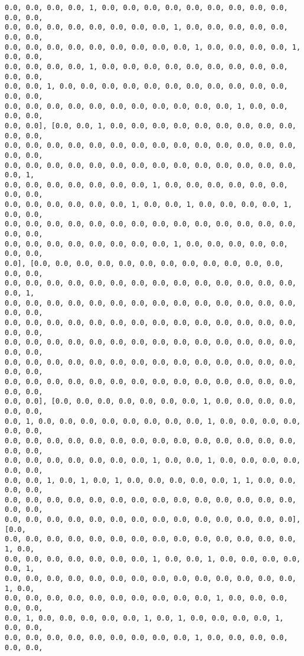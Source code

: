 \documentclass[11pt]{article}
\begin{document}
\begin{Verbatim}[commandchars=\\\{\}]
0.0, 0.0, 0.0, 0.0, 1, 0.0, 0.0, 0.0, 0.0, 0.0, 0.0, 0.0, 0.0, 0.0, 0.0, 0.0,
0.0, 0.0, 0.0, 0.0, 0.0, 0.0, 0.0, 0.0, 1, 0.0, 0.0, 0.0, 0.0, 0.0, 0.0, 0.0,
0.0, 0.0, 0.0, 0.0, 0.0, 0.0, 0.0, 0.0, 0.0, 1, 0.0, 0.0, 0.0, 0.0, 1, 0.0, 0.0,
0.0, 0.0, 0.0, 0.0, 1, 0.0, 0.0, 0.0, 0.0, 0.0, 0.0, 0.0, 0.0, 0.0, 0.0, 0.0,
0.0, 0.0, 1, 0.0, 0.0, 0.0, 0.0, 0.0, 0.0, 0.0, 0.0, 0.0, 0.0, 0.0, 0.0, 0.0,
0.0, 0.0, 0.0, 0.0, 0.0, 0.0, 0.0, 0.0, 0.0, 0.0, 0.0, 1, 0.0, 0.0, 0.0, 0.0,
0.0, 0.0], [0.0, 0.0, 1, 0.0, 0.0, 0.0, 0.0, 0.0, 0.0, 0.0, 0.0, 0.0, 0.0, 0.0,
0.0, 0.0, 0.0, 0.0, 0.0, 0.0, 0.0, 0.0, 0.0, 0.0, 0.0, 0.0, 0.0, 0.0, 0.0, 0.0,
0.0, 0.0, 0.0, 0.0, 0.0, 0.0, 0.0, 0.0, 0.0, 0.0, 0.0, 0.0, 0.0, 0.0, 0.0, 1,
0.0, 0.0, 0.0, 0.0, 0.0, 0.0, 0.0, 1, 0.0, 0.0, 0.0, 0.0, 0.0, 0.0, 0.0, 0.0,
0.0, 0.0, 0.0, 0.0, 0.0, 0.0, 1, 0.0, 0.0, 1, 0.0, 0.0, 0.0, 0.0, 1, 0.0, 0.0,
0.0, 0.0, 0.0, 0.0, 0.0, 0.0, 0.0, 0.0, 0.0, 0.0, 0.0, 0.0, 0.0, 0.0, 0.0, 0.0,
0.0, 0.0, 0.0, 0.0, 0.0, 0.0, 0.0, 0.0, 1, 0.0, 0.0, 0.0, 0.0, 0.0, 0.0, 0.0,
0.0], [0.0, 0.0, 0.0, 0.0, 0.0, 0.0, 0.0, 0.0, 0.0, 0.0, 0.0, 0.0, 0.0, 0.0,
0.0, 0.0, 0.0, 0.0, 0.0, 0.0, 0.0, 0.0, 0.0, 0.0, 0.0, 0.0, 0.0, 0.0, 0.0, 1,
0.0, 0.0, 0.0, 0.0, 0.0, 0.0, 0.0, 0.0, 0.0, 0.0, 0.0, 0.0, 0.0, 0.0, 0.0, 0.0,
0.0, 0.0, 0.0, 0.0, 0.0, 0.0, 0.0, 0.0, 0.0, 0.0, 0.0, 0.0, 0.0, 0.0, 0.0, 0.0,
0.0, 0.0, 0.0, 0.0, 0.0, 0.0, 0.0, 0.0, 0.0, 0.0, 0.0, 0.0, 0.0, 0.0, 0.0, 0.0,
0.0, 0.0, 0.0, 0.0, 0.0, 0.0, 0.0, 0.0, 0.0, 0.0, 0.0, 0.0, 0.0, 0.0, 0.0, 0.0,
0.0, 0.0, 0.0, 0.0, 0.0, 0.0, 0.0, 0.0, 0.0, 0.0, 0.0, 0.0, 0.0, 0.0, 0.0, 0.0,
0.0, 0.0], [0.0, 0.0, 0.0, 0.0, 0.0, 0.0, 0.0, 1, 0.0, 0.0, 0.0, 0.0, 0.0, 0.0,
0.0, 1, 0.0, 0.0, 0.0, 0.0, 0.0, 0.0, 0.0, 0.0, 1, 0.0, 0.0, 0.0, 0.0, 0.0, 0.0,
0.0, 0.0, 0.0, 0.0, 0.0, 0.0, 0.0, 0.0, 0.0, 0.0, 0.0, 0.0, 0.0, 0.0, 0.0, 0.0,
0.0, 0.0, 0.0, 0.0, 0.0, 0.0, 0.0, 1, 0.0, 0.0, 1, 0.0, 0.0, 0.0, 0.0, 0.0, 0.0,
0.0, 0.0, 1, 0.0, 1, 0.0, 1, 0.0, 0.0, 0.0, 0.0, 0.0, 1, 1, 0.0, 0.0, 0.0, 0.0,
0.0, 0.0, 0.0, 0.0, 0.0, 0.0, 0.0, 0.0, 0.0, 0.0, 0.0, 0.0, 0.0, 0.0, 0.0, 0.0,
0.0, 0.0, 0.0, 0.0, 0.0, 0.0, 0.0, 0.0, 0.0, 0.0, 0.0, 0.0, 0.0, 0.0], [0.0,
0.0, 0.0, 0.0, 0.0, 0.0, 0.0, 0.0, 0.0, 0.0, 0.0, 0.0, 0.0, 0.0, 0.0, 1, 0.0,
0.0, 0.0, 0.0, 0.0, 0.0, 0.0, 0.0, 1, 0.0, 0.0, 1, 0.0, 0.0, 0.0, 0.0, 0.0, 1,
0.0, 0.0, 0.0, 0.0, 0.0, 0.0, 0.0, 0.0, 0.0, 0.0, 0.0, 0.0, 0.0, 0.0, 1, 0.0,
0.0, 0.0, 0.0, 0.0, 0.0, 0.0, 0.0, 0.0, 0.0, 0.0, 1, 0.0, 0.0, 0.0, 0.0, 0.0,
0.0, 1, 0.0, 0.0, 0.0, 0.0, 0.0, 1, 0.0, 1, 0.0, 0.0, 0.0, 0.0, 1, 0.0, 0.0,
0.0, 0.0, 0.0, 0.0, 0.0, 0.0, 0.0, 0.0, 0.0, 1, 0.0, 0.0, 0.0, 0.0, 0.0, 0.0,

\end{Verbatim}
\end{document}
